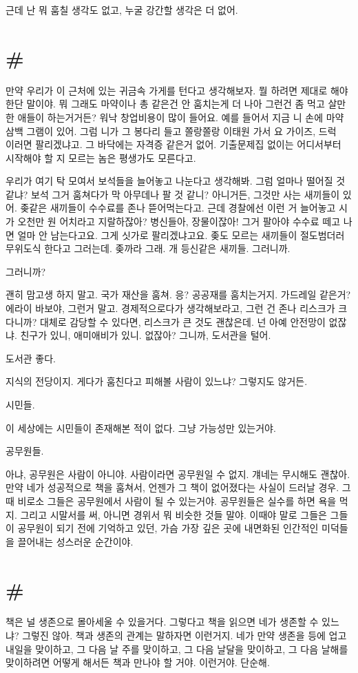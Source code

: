\documentclass[a5paper,10pt, twoside, openright]{memoir}
\begin{document}
	근데 난 뭐 훔칠 생각도 없고, 누굴 강간할 생각은 더 없어. 

	\section{\#}
	만약 우리가 이 근처에 있는 귀금속 가게를 턴다고 생각해보자. 뭘 하려면 제대로 해야 한단 말이야. 뭐 그래도 마약이나 총 같은건 안 훔치는게 더 나아 그런건 좀 먹고 살만한 애들이 하는거거든? 워낙 창업비용이 많이 들어요. 예를 들어서 지금 니 손에 마약 삼백 그램이 있어. 그럼 니가 그 봉다리 들고 쫄랑쫄랑 이태원 가서 요 가이즈, 드럭~ 이러면 팔리겠냐고. 그 바닥에는 자격증 같은거 없어. 기출문제집 없이는 어디서부터 시작해야 할 지 모르는 놈은 평생가도 모른다고.

	우리가 여기 탁 모여서 보석들을 늘어놓고 나눈다고 생각해봐. 그럼 얼마나 떨어질 것 같냐? 보석 그거 훔쳐다가 막 아무데나 팔 것 같니? 아니거든, 그것만 사는 새끼들이 있어. 좆같은 새끼들이 수수료를 존나 뜯어먹는다고. 근데 경찰에선 이런 거 늘어놓고 시가 오천만 원 어치라고 지랄하잖아? 병신들아, 장물이잖아! 그거 팔아야 수수료 떼고 나면 얼마 안 남는다고요. 그게 싯가로 팔리겠냐고요. 좆도 모르는 새끼들이 절도범더러 무위도식 한다고 그러는데. 좆까라 그래. 개 등신같은 새끼들. 그러니까. 

	그러니까? 
	
	괜히 맘고생 하지 말고. 국가 재산을 훔쳐. 응? 공공재를 훔치는거지. 가드레일 같은거? 에라이 바보야, 그런거 말고. 경제적으로다가 생각해보라고, 그런 건 존나 리스크가 크다니까? 대체로 감당할 수 있다면, 리스크가 큰 것도 괜찮은데.  넌 아예 안전망이 없잖냐. 친구가 있니, 애미애비가 있니. 없잖아? 그니까, 도서관을 털어. 
	
	도서관 좋다. 
	
	지식의 전당이지. 게다가 훔친다고 피해볼 사람이 있느냐? 그렇지도 않거든. 
	
	시민들.
	
	이 세상에는 시민들이 존재해본 적이 없다. 그냥 가능성만 있는거야.

	공무원들. 

	아냐, 공무원은 사람이 아니야. 사람이라면 공무원일 수 없지. 걔네는 무시해도 괜찮아. 만약 네가 성공적으로 책을 훔쳐서, 언젠가 그 책이 없어졌다는 사실이 드러날 경우. 그때 비로소 그들은 공무원에서 사람이 될 수 있는거야. 공무원들은 실수를 하면 욕을 먹지. 그리고 시말서를 써, 아니면 경위서 뭐 비슷한 것들 말야. 이때야 말로 그들은 그들이 공무원이 되기 전에 기억하고 있던, 가슴 가장 깊은 곳에 내면화된 인간적인 미덕들을 끌어내는 성스러운 순간이야.

	\section{\#}
	책은 널 생존으로 몰아세울 수 있을거다. 그렇다고 책을 읽으면 네가 생존할 수 있느냐? 그렇진 않아. 책과 생존의 관계는 말하자면 이런거지. 네가 만약 생존을 등에 업고 내일을 맞이하고, 그 다음 날 주를 맞이하고, 그 다음 날달을 맞이하고, 그 다음 날해를 맞이하려면 어떻게 해서든 책과 만나야 할 거야. 이런거야. 단순해. 
\end{document}
